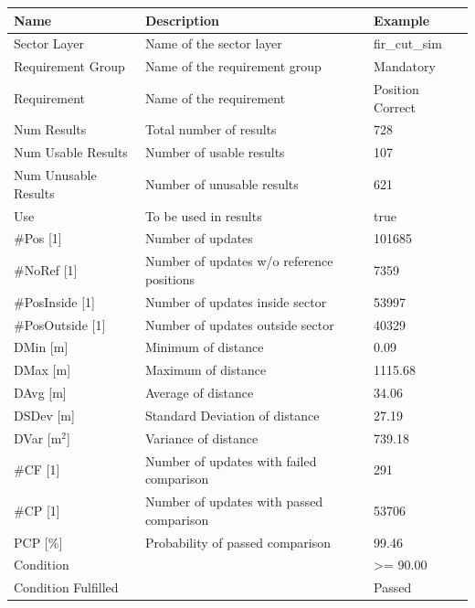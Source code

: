 \begin{center}
 \begin{table}[H]
  \begin{tabularx}{\textwidth}{ | l | X |  l | }
    \hline
    \textbf{Name} & \textbf{Description} & \textbf{Example} \\ \hline
    Sector Layer & Name of the sector layer & fir\_cut\_sim \\ \hline
    Requirement Group & Name of the requirement group & Mandatory \\ \hline
    Requirement & Name of the requirement & Position Correct \\ \hline
    Num Results & Total number of results & 728 \\ \hline
    Num Usable Results & Number of usable results & 107 \\ \hline
    Num Unusable Results & Number of unusable results & 621 \\ \hline
    Use & To be used in results & true \\ \hline
    \#Pos [1] & Number of updates & 101685 \\ \hline
    \#NoRef [1] & Number of updates w/o reference positions & 7359 \\ \hline
    \#PosInside [1] & Number of updates inside sector & 53997 \\ \hline
    \#PosOutside [1] & Number of updates outside sector & 40329 \\ \hline
    DMin [m] & Minimum of distance & 0.09 \\ \hline
    DMax [m] & Maximum of distance & 1115.68 \\ \hline
    DAvg [m] & Average of distance & 34.06 \\ \hline
    DSDev [m] & Standard Deviation of distance & 27.19 \\ \hline
    DVar [m$^2$] & Variance of distance & 739.18 \\ \hline
    \#CF [1] & Number of updates with failed comparison & 291 \\ \hline
    \#CP [1] & Number of updates with passed comparison  & 53706 \\ \hline
    PCP [\%] & Probability of passed comparison & 99.46 \\ \hline
    Condition &  & >= 90.00 \\ \hline
    Condition Fulfilled &  & Passed \\ \hline
\end{tabularx}
\end{table}
\end{center}

